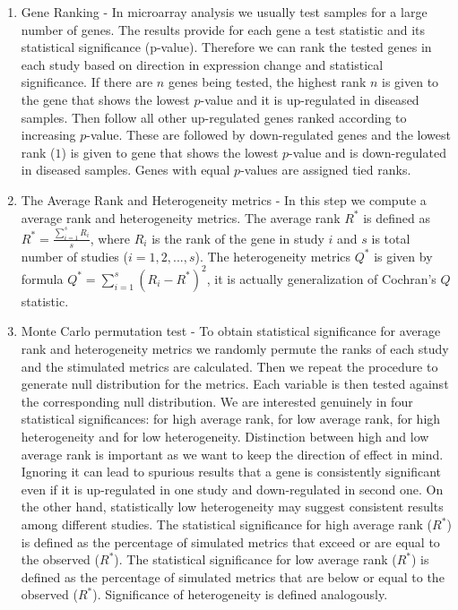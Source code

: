 \documentclass[a4paper]{report}
\begin{document}
\begin{enumerate}
\item Gene Ranking - In microarray analysis we usually test samples for a large number of genes. The results provide for each gene a test statistic and its statistical significance (p-value). Therefore we can rank the tested genes in each study based on direction in expression change and statistical significance. If there are $n$ genes being tested, the highest rank $n$ is given to the gene that shows the lowest $p$-value and it is up-regulated in diseased samples. Then follow all other up-regulated genes ranked according to increasing $p$-value. These are followed by down-regulated genes and the lowest rank ($1$) is given to gene that shows the lowest $p$-value and is down-regulated in diseased samples. Genes with equal $p$-values are assigned tied ranks. 
\item The Average Rank and Heterogeneity metrics - In this step we compute a average rank and heterogeneity metrics. The average rank $R^*$ is defined as $R^*= \frac{\sum_{i=1}^{s}R_i}{s}$, where $R_i$ is the rank of the gene in study $i$ and $s$ is total number of studies ($i=1,2,...,s$). The heterogeneity metrics $Q^*$ is given by formula $Q^*=\sum_{i=1}^{s}(R_i-R^*)^2$, it is actually generalization of Cochran's $Q$ statistic. 
\item Monte Carlo permutation test - To obtain statistical significance for average rank and heterogeneity metrics we randomly permute the ranks of each study and the stimulated metrics are calculated. Then we repeat the procedure to generate null distribution for the metrics. Each variable is then tested against the corresponding null distribution. We are interested genuinely in four statistical significances: for high average rank, for low average rank, for high heterogeneity and for low heterogeneity. Distinction between high and low average rank is important as we want to keep the direction of effect in mind. Ignoring it can lead to spurious results that a gene is consistently significant even if it is up-regulated in one study and down-regulated in second one. On the other hand, statistically low heterogeneity may suggest consistent results among different studies. The statistical significance for high average rank ($R^*$) is defined as the percentage of simulated metrics that exceed or are equal to the observed ($R^*$). The statistical significance for low average rank ($R^*$) is defined as the percentage of simulated metrics that are below or equal to the observed ($R^*$). Significance of heterogeneity is defined analogously.  
\end{enumerate}
\end{document}
